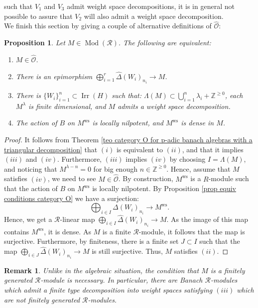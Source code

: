 \documentclass{amsart}
\newtheorem{prop}[defi]{ Proposition}
\newtheorem{obs}[defi]{{Remark}}
\newcommand{\Mod}{\operatorname{Mod}}
\newcommand{\OX}{\mathcal{O}}
\begin{document}
such that $V_1$ and $V_3$ admit weight space decompositions, it is in general not possible to assure that $V_2$ will also admit a weight space decomposition.\\
We finish this section by giving a couple of alternative definitions of $\widehat{\OX}:$
\begin{prop}\label{prop equivalent definitions of O}
Let $M\in \Mod(\mathscr{R})$. The following are equivalent:
\begin{enumerate}[label=(\roman*)]
    \item $M\in \widehat{\OX}$.
    \item There is an epimorphism $\bigoplus_{i=1}^r\widehat{\Delta}(W_i)_{n_i}\rightarrow M$.
    \item There is $\{W_i \}_{i=1}^n\subset \operatorname{Irr}(H)$ such that: $\Lambda(M)\subset \bigcup_{i=1}^n\lambda_i+\mathbb{Z}^{\geq 0}$, each $M^{\lambda}$ is finite dimensional, and  $M$ admits a weight space decomposition.
    \item  The action of $B$ on $M^{\operatorname{ws}}$ is locally nilpotent, and $M^{\operatorname{ws}}$ is dense in $M$.
\end{enumerate}
\end{prop}
\begin{proof}
It follows from Theorem \ref{teo category O for p-adic banach algebras with a triangular decomposition} that $(i)$ is equivalent to $(ii)$, and that it implies $(iii)$ and $(iv)$. Furthermore, $(iii)$ implies $(iv)$ by choosing $I=\Lambda(M)$, and noticing that $M^{\lambda-n}=0$ for big enough $n\in\mathbb{Z}^{\geq 0}$. Hence, assume that $M$ satisfies $(iv)$, we need to see  $M\in \widehat{\OX}$. By construction, $M^{\operatorname{ws}}$ is a $R$-module such that the action of $B$  on $M^{\operatorname{ws}}$ is locally nilpotent. By Proposition \ref{prop equiv conditions category O} we have a surjection:
\begin{equation*}
    \bigoplus_{i\in I}\Delta(W_i)_{n_i}\rightarrow M^{\operatorname{ws}}.
\end{equation*}
Hence, we get a $\mathscr{R}$-linear map $\bigoplus_{i\in I}\widehat{\Delta}(W_i)_{n_i}\rightarrow M$. As the image of this map contains $M^{\operatorname{ws}}$, it is dense. As $M$ is a finite $\mathscr{R}$-module, it follows that the map is surjective. Furthermore, by finiteness, there is a finite set $J\subset I$ such that the map 
$\bigoplus_{i\in J}\widehat{\Delta}(W_i)_{n_i}\rightarrow M$ is still surjective. Thus, $M$ satisfies $(ii)$.
\end{proof}
\begin{obs}
Unlike in the algebraic situation, the condition that $M$ is a finitely generated $\mathscr{R}$-module is necessary. In particular, there are Banach $\mathscr{R}$-modules which admit a finite type decomposition into weight spaces satisfying $(iii)$ which are not finitely generated $\mathscr{R}$-modules.
\end{obs}
\end{document}
